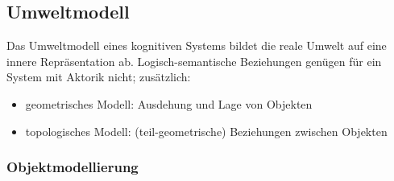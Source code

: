 \subsection{Umweltmodell}

Das Umweltmodell eines kognitiven Systems bildet die reale Umwelt auf eine innere Repräsentation ab. Logisch-semantische Beziehungen genügen für ein System mit Aktorik nicht; zusätzlich:
\begin{itemize}
\item geometrisches Modell: Ausdehung und Lage von Objekten
\item topologisches Modell: (teil-geometrische) Beziehungen zwischen Objekten
\end{itemize}


\subsubsection{Objektmodellierung}

